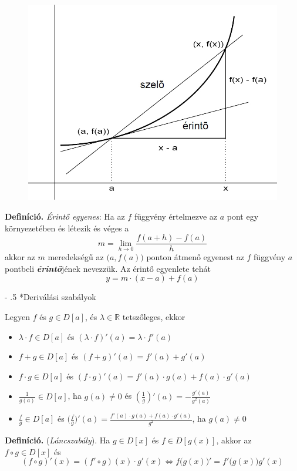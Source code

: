 \documentclass[12pt,margin=0px]{article}
\makeatletter
\newcommand\ddfrac[2]{\frac{\displaystyle #1}{\displaystyle #2}}
\renewcommand\paragraph{%
	\@startsection{paragraph}{4}{0mm}%
	{-\baselineskip}%
	{.5\baselineskip}%
	{\normalfont\normalsize\bfseries}}
\makeatother
\begin{document}
    \begin{figure}[H]
        \centering
        \includegraphics[width=0.6\linewidth]{img/diff.jpg}
        \label{diff}
    \end{figure}

    \noindent \textbf{Definíció.} \emph{Érintő egyenes}: Ha az $f$ függvény értelmezve az $a$ pont egy környezetében és létezik és véges a
    \[
             m = \lim\limits_{h \to 0}\ddfrac{f(a+h) - f(a)}{h}
    \]
    akkor az $m$ meredekségű az $\big(a, f(a)\big)$ ponton átmenő egyenest az $f$ függvény $a$ pontbeli \textbf{\emph{érintő}}jének nevezzük. Az érintő egyenlete tehát
    \[
        y = m \cdot (x-a) + f(a)
    \]

    \paragraph*{Deriválási szabályok}

    \noindent Legyen $f$ és $g \in D[a]$, és $\lambda \in \mathbb{R}$ tetszőleges, ekkor
    \begin{itemize}
        \item $\lambda \cdot f \in D[a]$ és $(\lambda \cdot f)'(a) = \lambda \cdot f'(a)$
        \item $f + g \in D[a]$ és $(f + g)'(a) = f'(a) + g'(a)$
        \item $f \cdot g \in D[a]$ és $(f \cdot g)'(a) = f'(a) \cdot g(a) + f(a) \cdot g'(a)$
        \item $\ddfrac{1}{g(a)} \in D[a]$, ha $g(a) \neq 0$ és $(\ddfrac{1}{g})'(a) = -\ddfrac{g'(a)}{g^{2}(a)}$
        \item $\ddfrac{f}{g} \in D[a]$ és $\big(\ddfrac{f}{g}\big)'(a) = \ddfrac{f'(a) \cdot g(a) + f(a) \cdot g'(a)}{g^2}$, ha $g(a) \neq 0$
    \end{itemize}

    \noindent \textbf{Definíció.} (\emph{Láncszabály}). Ha $g \in D[x]$ és $f \in D[g(x)]$, akkor az $f \circ g \in D[x]$ és
    \[
        (f \circ g)'(x) = (f' \circ g)(x) \cdot g'(x) \Leftrightarrow f\big(g(x)\big)' = f'\big(g(x)\big)g'(x)
    \]
\end{document}
